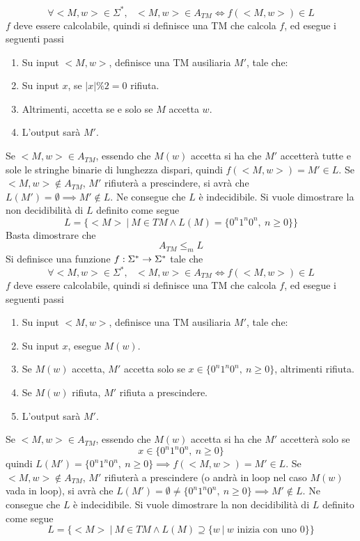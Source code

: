 \documentclass[10pt, letterpaper]{report}
\begin{document}
$$ \forall <M,w>\in\Sigma^*, \ \ \  <M,w>\in A_{TM}\iff f( <M,w>)\in L$$
$f$ deve essere calcolabile, quindi si definisce una TM che calcola $f$, ed esegue i seguenti passi 
\begin{enumerate}
    \item  Su input $<M,w>$, definisce una TM ausiliaria $M'$, tale che:
    \item Su input $x$, se $|x|\%2=0$ rifiuta. 
    \item Altrimenti, accetta se e solo se $M$ accetta $w$.
    \item L'output sarà $M'$.
\end{enumerate}
\boxedMath{$\implies$} Se $<M,w>\in A_{TM}$, essendo che $M(w)$ accetta si ha che 
$M'$ accetterà tutte e sole le stringhe binarie di lunghezza dispari, quindi $f(<M,w>)=M'\in L$.
\acc \boxedMath{$\impliedby$} Se $<M,w>\notin A_{TM}$, $M'$ rifiuterà a prescindere, si avrà che 
$L(M')=\emptyset\implies M'\notin L$. Ne consegue che $L$ è indecidibile.
Si vuole dimostrare la non decidibilità di $L$ definito come segue 
$$ L=\{<M>\ | \ M\in TM \land L(M)=\{0^n1^n0^n,\ n\ge 0\}\}$$ 
Basta dimostrare che $$ A_{TM}\le_m  L$$Si definisce una funzione ${f:\Sigma^*\rightarrow \Sigma^*}$ tale che 
$$ \forall <M,w>\in\Sigma^*, \ \ \  <M,w>\in A_{TM}\iff f( <M,w>)\in L$$
$f$ deve essere calcolabile, quindi si definisce una TM che calcola $f$, ed esegue i seguenti passi 
\begin{enumerate}
    \item  Su input $<M,w>$, definisce una TM ausiliaria $M'$, tale che:
    \item Su input $x$, esegue $M(w)$. 
    \item Se $M(w)$ accetta, $M'$ accetta solo se $x\in\{0^n1^n0^n,\ n\ge 0\}$, altrimenti rifiuta.
    \item Se $M(w)$ rifiuta, $M'$ rifiuta a prescindere. 
    \item L'output sarà $M'$.
\end{enumerate}
\boxedMath{$\implies$} Se $<M,w>\in A_{TM}$, essendo che $M(w)$ accetta si ha che 
$M'$ accetterà solo se $$x\in\{0^n1^n0^n,\ n\ge 0\}$$quindi $L(M')=\{0^n1^n0^n,\ n\ge 0\} \implies f(<M,w>)=M'\in L$.
\acc \boxedMath{$\impliedby$} Se $<M,w>\notin A_{TM}$, $M'$ rifiuterà a prescindere (o andrà in loop nel caso $M(w)$ vada in loop), si avrà che 
$L(M')=\emptyset\ne \{0^n1^n0^n,\ n\ge 0\} \implies M'\notin L$. Ne consegue che $L$ è indecidibile.
Si vuole dimostrare la non decidibilità di $L$ definito come segue 
$$ L=\{<M>\ | \ M\in TM \land L(M)\supseteq \{w\ | \ w\text{ inizia con uno }0\}\}$$ 
\end{document}
